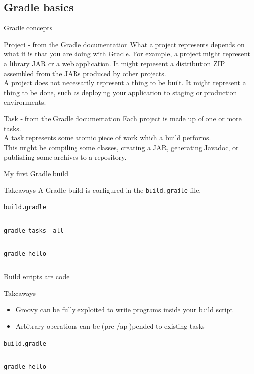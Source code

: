 \documentclass[presentation]{beamer}
\newcommand{\codefile}[4]{
	\begin{block}{\texttt{#2}}
		\inputminted[fontsize=#3,linenos=true,breaklines=true]{#4}{"workspace/#1/#2"}
	\end{block}
}
\newcommand{\groovy}[3]{\codefile{#1}{#2}{#3}{groovy}}
\newcommand{\terminal}[3]{\codefile{#1}{#2}{#3}{text}}
\newcommand{\tinier}{\fontsize{4pt}{5pt}\selectfont}
\begin{document}
\subsection{Gradle basics}

\begin{frame}[fragile]{Gradle concepts}
	\begin{block}{Project - from the Gradle documentation}
			What a project represents depends on what it is that you are doing with Gradle. For example, a project might represent a library JAR or a web application. It might represent a distribution ZIP assembled from the JARs produced by other projects. \\
			A project does not necessarily represent a thing to be built.
			It might represent a thing to be done, such as deploying your application to staging or production environments.
	\end{block}
	\begin{block}{Task - from the Gradle documentation}
			Each project is made up of one or more tasks. \\
			A task represents some atomic piece of work which a build performs.\\
			This might be compiling some classes, creating a JAR, generating Javadoc, or publishing some archives to a repository.
	\end{block}
\end{frame}

\begin{frame}{My first Gradle build}
    \begin{block}{Takeaways}
        A Gradle build is configured in the \texttt{build.gradle} file.
    \end{block}
    \groovy{02-SimpleTask}{build.gradle}{\normalsize}
    \terminal{02-SimpleTask}{gradle tasks --all}{\tinier} 
    \terminal{02-SimpleTask}{gradle hello}{\normalsize}
\end{frame}

\begin{frame}{Build scripts are code}
    \begin{block}{Takeaways}
        \begin{itemize}
            \item Groovy can be fully exploited to write programs inside your build script
            \item Arbitrary operations can be (pre-/ap-)pended to existing tasks
        \end{itemize}
    \end{block}
    \groovy{03-BuildAsCode}{build.gradle}{\normalsize}
    \terminal{03-BuildAsCode}{gradle hello}{\normalsize}
\end{frame}
\end{document}
